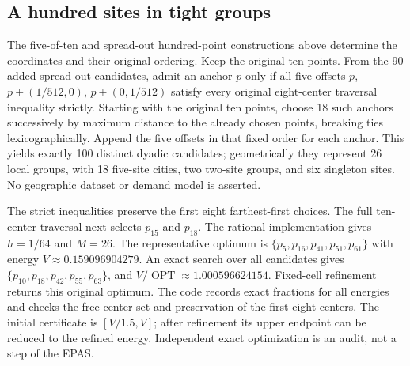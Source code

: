 \documentclass[a4paper,12pt]{article}
\newcommand{\OPT}{\operatorname{OPT}}
\numberwithin{equation}{section}
\begin{document}
\FloatBarrier


\subsection{A hundred sites in tight groups}\label{sec:city-details}
The five-of-ten and spread-out hundred-point constructions above determine the coordinates and
their original ordering. Keep the original ten points. From the 90 added spread-out candidates,
admit an anchor $p$ only if all five offsets $p$, $p\pm(1/512,0)$, $p\pm(0,1/512)$ satisfy every
original eight-center traversal inequality strictly. Starting with the original ten points, choose
18 such anchors successively by maximum distance to the already chosen points, breaking ties
lexicographically. Append the five offsets in that fixed order for each anchor. This yields
exactly 100 distinct dyadic candidates; geometrically they represent 26 local groups, with 18
five-site cities, two two-site groups, and six singleton sites. No geographic dataset or demand
model is asserted.

The strict inequalities preserve the first eight farthest-first choices. The full
ten-center traversal next selects $p_{15}$ and $p_{18}$.
The rational implementation gives $h=1/64$ and $M=26$. The representative optimum is
$\{p_5,p_{16},p_{41},p_{51},p_{61}\}$ with energy $V\approx0.159096904279$. An exact search over
all candidates gives $\{p_{10},p_{18},p_{42},p_{55},p_{63}\}$, and $V/\OPT\approx1.000596624154$.
Fixed-cell refinement returns this original optimum. The code records exact fractions for all
energies and checks the free-center set and preservation of the first eight centers. The initial
certificate is $[V/1.5,V]$; after refinement its upper endpoint can be reduced to the refined
energy. Independent exact optimization is an audit, not a step of the EPAS.
\end{document}
